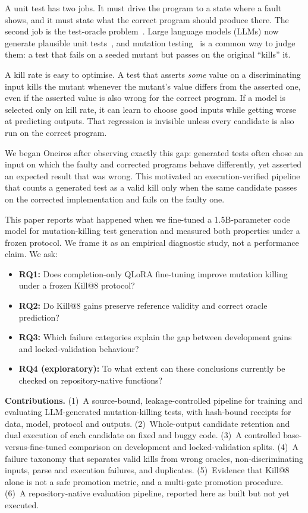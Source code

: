 \documentclass[conference,a4paper]{IEEEtran}
\makeatletter
\newcommand{\killk}[1]{Kill@#1}
\makeatother
\begin{document}
A unit test has two jobs. It must drive the program to a state where a fault shows,
and it must state what the correct program should produce there. The second job is the
test-oracle problem~\cite{barr2015oracle}. Large language models (LLMs) now generate
plausible unit tests~\cite{schafer2024llmunit,lemieux2023codamosa,wang2024testingsurvey},
and mutation testing~\cite{jia2011mutation,papadakis2019mutation} is a common way to
judge them: a test that fails on a seeded mutant but passes on the original
``kills'' it.

A kill rate is easy to optimise. A test that asserts \emph{some} value on a
discriminating input kills the mutant whenever the mutant's value differs from the
asserted one, even if the asserted value is also wrong for the correct program. If a
model is selected only on kill rate, it can learn to choose good inputs while getting
worse at predicting outputs. That regression is invisible unless every candidate is
also run on the correct program.

We began Oneiros after observing exactly this gap: generated tests often chose an
input on which the faulty and corrected programs behave differently, yet asserted an
expected result that was wrong. This motivated an execution-verified pipeline that
counts a generated test as a valid kill only when the same candidate passes on the
corrected implementation and fails on the faulty one.

This paper reports what happened when we fine-tuned a 1.5B-parameter code model for
mutation-killing test generation and measured both properties under a frozen
protocol. We frame it as an empirical diagnostic study, not a performance claim. We ask:

\begin{itemize}
\item \textbf{RQ1:} Does completion-only QLoRA fine-tuning improve mutation killing
under a frozen \killk{8} protocol?
\item \textbf{RQ2:} Do \killk{8} gains preserve reference validity and correct
oracle prediction?
\item \textbf{RQ3:} Which failure categories explain the gap between development
gains and locked-validation behaviour?
\item \textbf{RQ4 (exploratory):} To what extent can these conclusions currently be
checked on repository-native functions?
\end{itemize}

\textbf{Contributions.} (1)~A source-bound, leakage-controlled pipeline for training
and evaluating LLM-generated mutation-killing tests, with hash-bound receipts for data,
model, protocol and outputs. (2)~Whole-output candidate retention and dual execution
of each candidate on fixed and buggy code. (3)~A controlled base-versus-fine-tuned
comparison on development and locked-validation splits. (4)~A failure taxonomy that
separates valid kills from wrong oracles, non-discriminating inputs, parse and
execution failures, and duplicates. (5)~Evidence that \killk{8} alone is not a safe
promotion metric, and a multi-gate promotion procedure. (6)~A repository-native
evaluation pipeline, reported here as built but not yet executed.
\end{document}
